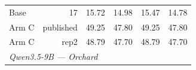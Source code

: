 \begin{table}[t]
{\begin{tabular}{lrrrrr}
Base & 17 & 15.72 & 14.98 & 15.47 & 14.78 \\
Arm C & published & 49.25 & 47.80 & 49.25 & 47.80 \\
Arm C & rep2 & 48.79 & 47.70 & 48.79 & 47.70 \\
\midrule
\multicolumn{6}{l}{\textit{Qwen3.5-9B --- Orchard}} \\

\end{tabular}}
\end{table}
